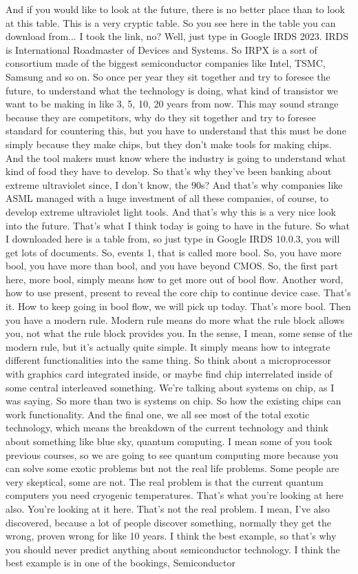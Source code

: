 And if you would like to look at the future, there is no better place than to look at this table. This is a very cryptic table. So you see here in the table you can download from... I took the link, no? Well, just type in Google IRDS 2023. IRDS is International Roadmaster of Devices and Systems. So IRPX is a sort of consortium made of the biggest semiconductor companies like Intel, TSMC, Samsung and so on. So once per year they sit together and try to foresee the future, to understand what the technology is doing, what kind of transistor we want to be making in like 3, 5, 10, 20 years from now. This may sound strange because they are competitors, why do they sit together and try to foresee standard for countering this, but you have to understand that this must be done simply because they make chips, but they don't make tools for making chips. And the tool makers must know where the industry is going to understand what kind of food they have to develop. So that's why they've been banking about extreme ultraviolet since, I don't know, the 90s? And that's why companies like ASML managed with a huge investment of all these companies, of course, to develop extreme ultraviolet light tools. And that's why this is a very nice look into the future. That's what I think today is going to have in the future. So what I downloaded here is a table from, so just type in Google IRDS 10.0.3, you will get lots of documents. So, events 1, that is called more bool. So, you have more bool, you have more than bool, and you have beyond CMOS. So, the first part here, more bool, simply means how to get more out of bool flow. Another word, how to use present, present to reveal the core chip to continue device case. That's it. How to keep going in bool flow, we will pick up today. That's more bool. Then you have a modern rule. Modern rule means do more what the rule block allows you, not what the rule block provides you. In the sense, I mean, some sense of the modern rule, but it's actually quite simple. It simply means how to integrate different functionalities into the same thing. So think about a microprocessor with graphics card integrated inside, or maybe find chip interrelated inside of some central interleaved something. We're talking about systems on chip, as I was saying. So more than two is systems on chip. So how the existing chips can work functionality. And the final one, we all see most of the total exotic technology, which means the breakdown of the current technology and think about something like blue sky, quantum computing. I mean some of you took previous courses, so we are going to see quantum computing more because you can solve some exotic problems but not the real life problems. Some people are very skeptical, some are not. The real problem is that the current quantum computers you need cryogenic temperatures. That's what you're looking at here also. You're looking at it here. That's not the real problem. I mean, I've also discovered, because a lot of people discover something, normally they get the wrong, proven wrong for like 10 years. I think the best example, so that's why you should never predict anything about semiconductor technology. I think the best example is in one of the bookings, Semiconductor 